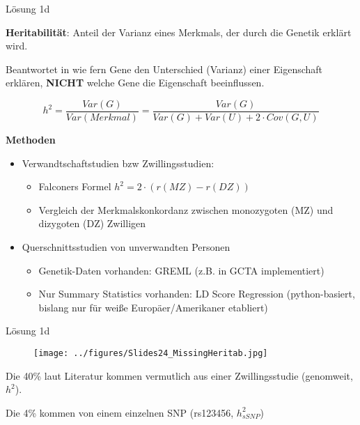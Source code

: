 \documentclass{beamer}
\begin{document}
\begin{frame}{Lösung 1d}

\textbf{Heritabilität}: Anteil der Varianz eines Merkmals, der durch die Genetik erklärt wird. 

Beantwortet in wie fern Gene den Unterschied (Varianz) einer Eigenschaft erklären, \textbf{NICHT} welche Gene die Eigenschaft beeinflussen. 

$$ h^2 = \frac{Var(G)}{Var(Merkmal)} = \frac{Var(G)}{Var(G) + Var(U) + 2 \cdot Cov(G, U)}$$

\textbf{Methoden}

\begin{itemize}
    \item Verwandtschaftstudien bzw Zwillingsstudien:
    \begin{itemize}
        \item Falconers Formel $h^2=2 \cdot (r(MZ) - r(DZ))$ 
        \item Vergleich der Merkmalskonkordanz zwischen monozygoten (MZ) und dizygoten (DZ) Zwilligen
    \end{itemize}
    \item Querschnittsstudien von unverwandten Personen
    \begin{itemize}
        \item Genetik-Daten vorhanden: GREML (z.B. in GCTA implementiert)
        \item Nur Summary Statistics vorhanden: LD Score Regression (python-basiert, bislang nur für weiße Europäer/Amerikaner etabliert)
    \end{itemize}
\end{itemize}

\end{frame}

\begin{frame}{Lösung 1d}

\begin{figure}[h]
\begin{center}
\texttt{[image: ../figures/Slides24\_MissingHeritab.jpg]}
\label{fig:Heritab}
\end{center}
\end{figure}

Die 40\% laut Literatur kommen vermutlich aus einer Zwillingsstudie (genomweit, $h^2$).

Die 4\% kommen von einem einzelnen SNP (rs123456, $h_{sSNP}^2$)

\end{frame}
\end{document}
